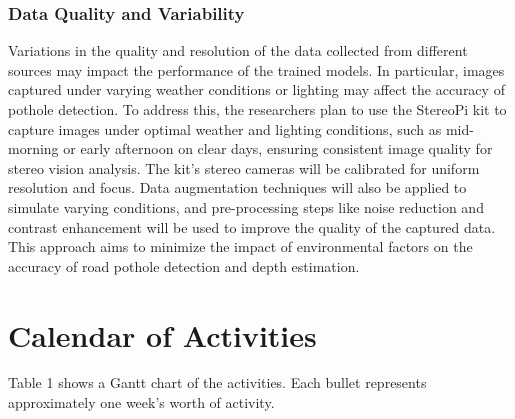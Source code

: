 \subsubsection{Data Quality and Variability}
Variations in the quality and resolution of the data collected from different sources may impact the performance of the trained models. In particular, images captured under varying weather conditions or lighting may affect the accuracy of pothole detection. To address this, the researchers plan to use the StereoPi kit to capture images under optimal weather and lighting conditions, such as mid-morning or early afternoon on clear days, ensuring consistent image quality for stereo vision analysis. The kit’s stereo cameras will be calibrated for uniform resolution and focus. Data augmentation techniques will also be applied to simulate varying conditions, and pre-processing steps like noise reduction and contrast enhancement will be used to improve the quality of the captured data. This approach aims to minimize the impact of environmental factors on the accuracy of road pothole detection and depth estimation.


\section{Calendar of Activities}
Table 1 shows a Gantt chart of the activities. Each bullet represents approximately one week's worth of activity.
%
%

%
%
\begin{comment}
   \newcommand{\weekone}{$\star$}
   \newcommand{\weektwo}{$\star \star$}
   \newcommand{\weekthree}{$\star \star \star$}
   \newcommand{\weekfour}{$\star \star \star \star$ }
\end{comment}



